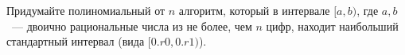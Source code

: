 Придумайте полиномиальный от $n$ алгоритм, который в интервале $[a, b)$, где $a, b$~--- двоично
рациональные числа из не более, чем $n$ цифр, находит наибольший стандартный интервал (вида
$[0.r0, 0.r1)$).
